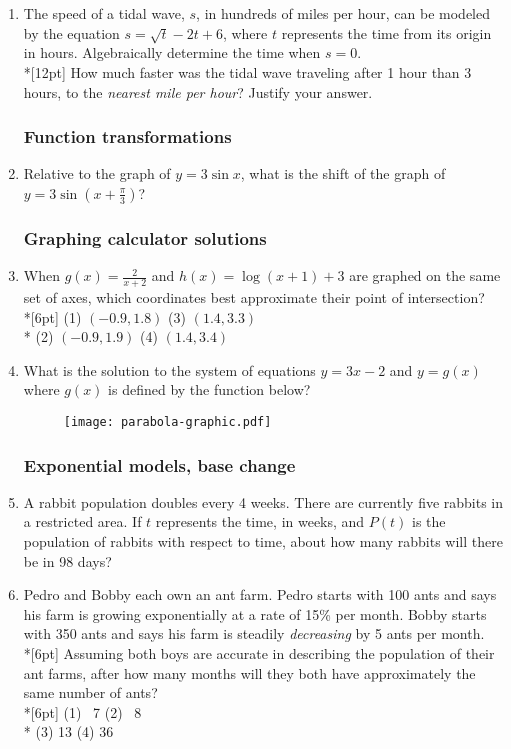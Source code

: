 \documentclass[12pt, oneside]{article}
\begin{document}
\begin{enumerate}
\item The speed of a tidal wave, $s$, in hundreds of miles per hour, can be modeled by the equation $s= \sqrt{t}-2t+6$, where $t$ represents the time from its origin in hours. Algebraically determine the time when $s=0$.\\*[12pt]
How much faster was the tidal wave traveling after 1 hour than 3 hours, to the \textit{nearest mile per hour}? Justify your answer.


\subsubsection*{Function transformations}
\item Relative to the graph of $y=3 \sin x$, what is the shift of the graph of $y=3 \sin {\left(x+ \frac{\pi}{3}\right)}$?

\subsubsection*{Graphing calculator solutions}
\item When $\displaystyle g(x)=\frac{2}{x+2}$ and $h(x)= \log (x+1)+3$ are graphed on the same set of axes, which coordinates best approximate their point of intersection?\\*[6pt]
(1) $(-0.9,1.8)$ \qquad (3) $(1.4,3.3)$ \\*
(2) $(-0.9,1.9)$ \qquad (4) $(1.4,3.4)$

\item What is the solution to the system of equations $y=3x-2$ and $y=g(x)$ where $g(x)$ is defined by the function below?

\begin{figure}[!ht]
    \centering
    \texttt{[image: parabola-graphic.pdf]}
\end{figure}


\subsubsection*{Exponential models, base change}
\item A rabbit population doubles every 4 weeks. There are currently five rabbits in a restricted area. If $t$ represents the time, in weeks, and $P(t)$ is the population of rabbits with respect to time, about how many rabbits will there be in 98 days?

\item Pedro and Bobby each own an ant farm. Pedro starts with 100 ants and says his farm is growing exponentially at a rate of 15\% per month. Bobby starts with 350 ants and says his farm is steadily \textit{decreasing} by 5 ants per month.\\*[6pt]
Assuming both boys are accurate in describing the population of their ant farms, after how many months will they both have approximately the same number of ants?\\*[6pt]
(1) \, 7 \qquad (2) \, 8 \\*
(3) 13 \qquad (4) 36


\end{enumerate}
\end{document}
